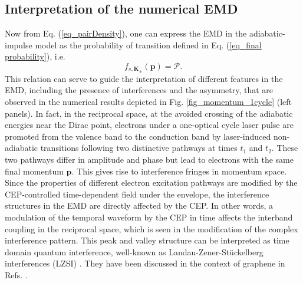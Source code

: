 \documentclass[9pt,twocolumn,twoside]{osajnl}
\begin{document}
\subsection{Interpretation of the numerical EMD}
 Now from Eq. (\ref{eq_pairDensity}), one can express the EMD in the adiabatic-impulse model as the probability of transition defined in Eq. (\ref{eq_final probability}), i.e.
\begin{equation}
f_{s,\mathbf{K}_{\pm}}(\textbf{p}) = \mathcal{P}.
\end{equation}
This relation can serve to guide the interpretation of different features in the EMD, including the presence of interferences and the asymmetry, that are observed in the numerical results depicted in Fig. \ref{fig_momentum_1cycle} (left panels). 
In fact, in the reciprocal space, at the avoided crossing of the adiabatic energies near the Dirac point, electrons under a one-optical cycle laser pulse are promoted from the valence band to the conduction band by laser-induced non-adiabatic transitions following two distinctive pathways at times $t_1$ and $t_{2}$. These two pathways differ in amplitude and phase but lead to electrons with the same final momentum $\mathbf{p}$. This gives rise to interference fringes in momentum space.
 Since the properties of different electron excitation pathways are modified by the CEP-controlled time-dependent field under the envelope, the interference structures in the EMD are directly affected by the CEP. In other words, a modulation  of the temporal waveform by the CEP in time affects the interband coupling in the reciprocal space, which is seen in the modification of the complex interference pattern. 
%  
   This  peak and valley structure can be interpreted as time domain quantum interference, well-known as Landau-Zener-St\"uckelberg interferences (LZSI) \cite{Shevchenko20101}. They have been discussed in the context of graphene in Refs. \cite{PhysRevB.94.125423,Higuchi:2017fk,PhysRevB.93.155434,PhysRevB.88.241112}.
 
\end{document}
